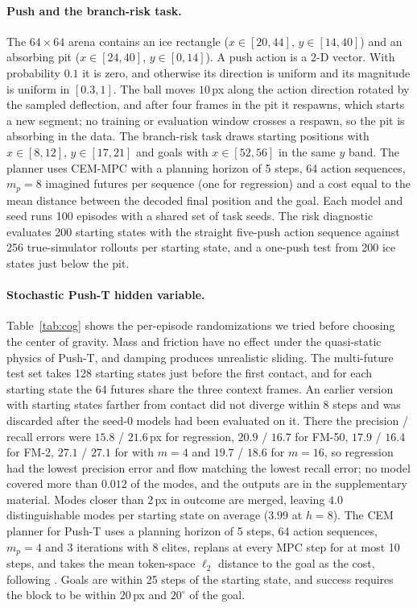 \paragraph{Push and the branch-risk task.}
The $64\times64$ arena contains an ice rectangle ($x \in [20, 44]$, $y \in [14, 40]$) and an absorbing pit ($x \in [24, 40]$, $y \in [0, 14]$). A push action is a 2-D vector. With probability $0.1$ it is zero, and otherwise its direction is uniform and its magnitude is uniform in $[0.3, 1]$. The ball moves $10$\,px along the action direction rotated by the sampled deflection, and after four frames in the pit it respawns, which starts a new segment; no training or evaluation window crosses a respawn, so the pit is absorbing in the data. The branch-risk task draws starting positions with $x \in [8, 12]$, $y \in [17, 21]$ and goals with $x \in [52, 56]$ in the same $y$ band. The planner uses CEM-MPC with a planning horizon of 5 steps, 64 action sequences, $m_p{=}8$ imagined futures per sequence (one for regression) and a cost equal to the mean distance between the decoded final position and the goal. Each model and seed runs 100 episodes with a shared set of task seeds. The risk diagnostic evaluates 200 starting states with the straight five-push action sequence against 256 true-simulator rollouts per starting state, and a one-push test from 200 ice states just below the pit.

\paragraph{Stochastic Push-T hidden variable.}
Table~\ref{tab:cog} shows the per-episode randomizations we tried before choosing the center of gravity. Mass and friction have no effect under the quasi-static physics of Push-T, and damping produces unrealistic sliding. The multi-future test set takes 128 starting states just before the first contact, and for each starting state the 64 futures share the three context frames. An earlier version with starting states farther from contact did not diverge within 8 steps and was discarded after the seed-0 models had been evaluated on it. There the precision / recall errors were $15.8$ / $21.6$\,px for regression, $20.9$ / $16.7$ for FM-50, $17.9$ / $16.4$ for FM-2, $27.1$ / $27.1$ for \imlewm{} with $m{=}4$ and $19.7$ / $18.6$ for $m{=}16$, so regression had the lowest precision error and flow matching the lowest recall error; no model covered more than $0.012$ of the modes, and the outputs are in the supplementary material. Modes closer than $2$\,px in outcome are merged, leaving $4.0$ distinguishable modes per starting state on average ($3.99$ at $h{=}8$). The CEM planner for Push-T uses a planning horizon of 5 steps, 64 action sequences, $m_p{=}4$ and 3 iterations with 8 elites, replans at every MPC step for at most 10 steps, and takes the mean token-space $\ell_2$ distance to the goal as the cost, following \citet{terver2025drives}. Goals are within 25 steps of the starting state, and success requires the block to be within $20$\,px and $20^\circ$ of the goal.

